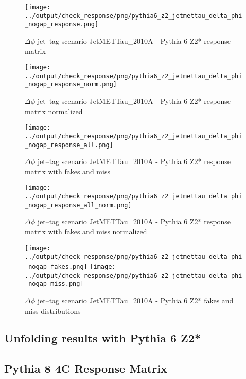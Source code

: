 \documentclass[11pt]{book}
\begin{document}
\begin{figure}[ht]
\centering
\texttt{[image: ../output/check\_response/png/pythia6\_z2\_jetmettau\_delta\_phi\_nogap\_response.png]}
\caption{$\Delta\phi$ jet--tag scenario JetMETTau\_2010A - Pythia 6 Z2* response matrix}
\label{p6_jetmettau_delta_phi_nogap_response}
\end{figure}

\begin{figure}[ht]
\centering
\texttt{[image: ../output/check\_response/png/pythia6\_z2\_jetmettau\_delta\_phi\_nogap\_response\_norm.png]}
\caption{$\Delta\phi$ jet--tag scenario JetMETTau\_2010A - Pythia 6 Z2* response matrix normalized}
\label{p6_jetmettau_delta_phi_nogap_response_norm}
\end{figure}

\begin{figure}[ht]
\centering
\texttt{[image: ../output/check\_response/png/pythia6\_z2\_jetmettau\_delta\_phi\_nogap\_response\_all.png]}
\caption{$\Delta\phi$ jet--tag scenario JetMETTau\_2010A - Pythia 6 Z2* response matrix with fakes and miss}
\label{p6_jetmettau_delta_phi_nogap_response_all}
\end{figure}

\begin{figure}[ht]
\centering
\texttt{[image: ../output/check\_response/png/pythia6\_z2\_jetmettau\_delta\_phi\_nogap\_response\_all\_norm.png]}
\caption{$\Delta\phi$ jet--tag scenario JetMETTau\_2010A - Pythia 6 Z2* response matrix with fakes and miss normalized}
\label{p6_jetmettau_delta_phi_nogap_response_all_norm}
\end{figure}

\begin{figure}[ht]
\centering
\texttt{[image: ../output/check\_response/png/pythia6\_z2\_jetmettau\_delta\_phi\_nogap\_fakes.png]}
\texttt{[image: ../output/check\_response/png/pythia6\_z2\_jetmettau\_delta\_phi\_nogap\_miss.png]}
\caption{$\Delta\phi$ jet--tag scenario JetMETTau\_2010A - Pythia 6 Z2* fakes and miss distributions}
\label{p6_jetmettau_delta_phi_nogap_fakesmiss}
\end{figure}


\clearpage
\subsection{Unfolding results with Pythia 6 Z2*}


\clearpage
\subsection{Pythia 8 4C Response Matrix}
\end{document}
